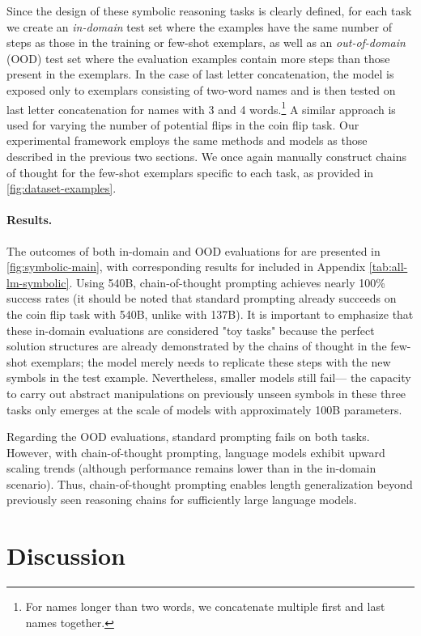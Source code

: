 Since the design of these symbolic reasoning tasks is clearly defined, for each task we create an \textit{in-domain} test set where the examples have the same number of steps as those in the training or few-shot exemplars, as well as an \textit{out-of-domain} (OOD) test set where the evaluation examples contain more steps than those present in the exemplars. In the case of last letter concatenation, the model is exposed only to exemplars consisting of two-word names and is then tested on last letter concatenation for names with 3 and 4 words.\footnote{For names longer than two words, we concatenate multiple first and last names together.} A similar approach is used for varying the number of potential flips in the coin flip task. Our experimental framework employs the same methods and models as those described in the previous two sections. We once again manually construct chains of thought for the few-shot exemplars specific to each task, as provided in \cref{fig:dataset-examples}.

\paragraph{Results.} 
The outcomes of both in-domain and OOD evaluations for \palm{} are presented in \cref{fig:symbolic-main}, with corresponding results for \lamda{} included in Appendix \cref{tab:all-lm-symbolic}. Using \palm{} 540B, chain-of-thought prompting achieves nearly 100\% success rates (it should be noted that standard prompting already succeeds on the coin flip task with \palm{} 540B, unlike with \lamda{} 137B). It is important to emphasize that these in-domain evaluations are considered "toy tasks" because the perfect solution structures are already demonstrated by the chains of thought in the few-shot exemplars; the model merely needs to replicate these steps with the new symbols in the test example. Nevertheless, smaller models still fail— the capacity to carry out abstract manipulations on previously unseen symbols in these three tasks only emerges at the scale of models with approximately 100B parameters.

Regarding the OOD evaluations, standard prompting fails on both tasks. However, with chain-of-thought prompting, language models exhibit upward scaling trends (although performance remains lower than in the in-domain scenario). Thus, chain-of-thought prompting enables length generalization beyond previously seen reasoning chains for sufficiently large language models.

\section{Discussion}\label{sec:discussion}

